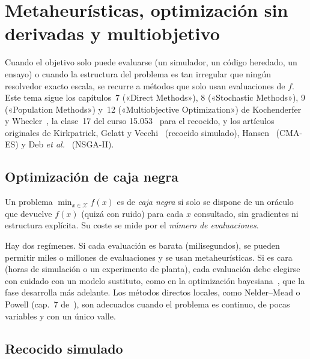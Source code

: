 \chapter{Metaheurísticas, optimización sin derivadas y multiobjetivo}
\label{tema:5}

Cuando el objetivo solo puede evaluarse (un simulador, un código heredado, un ensayo) o cuando la estructura del problema es tan irregular que ningún resolvedor exacto escala, se recurre a métodos que solo usan evaluaciones de $f$. Este tema sigue los capítulos~7 («Direct Methods»), 8 («Stochastic Methods»), 9 («Population Methods») y~12 («Multiobjective Optimization») de Kochenderfer y Wheeler~\cite{kw}, la clase~17 del curso 15.053~\cite{mit15053} para el recocido, y los artículos originales de Kirkpatrick, Gelatt y Vecchi~\cite{kirkpatrick} (recocido simulado), Hansen~\cite{hansen} (CMA-ES) y Deb \emph{et al.}~\cite{nsga2} (NSGA-II).

\section{Optimización de caja negra}

\begin{definicion}\label{def:caja-negra}
Un problema $\min_{x\in\mathcal{X}}f(x)$ es de \emph{caja negra} si solo se dispone de un oráculo que devuelve $f(x)$ (quizá con ruido) para cada $x$ consultado, sin gradientes ni estructura explícita. Su coste se mide por el \emph{número de evaluaciones}.
\end{definicion}

Hay dos regímenes. Si cada evaluación es barata (milisegundos), se pueden permitir miles o millones de evaluaciones y se usan metaheurísticas. Si es cara (horas de simulación o un experimento de planta), cada evaluación debe elegirse con cuidado con un modelo sustituto, como en la optimización bayesiana~\cite{garnett,frazier}, que la fase desarrolla más adelante. Los métodos directos locales, como Nelder--Mead o Powell (cap.~7 de~\cite{kw}), son adecuados cuando el problema es continuo, de pocas variables y con un único valle.

\section{Recocido simulado}

